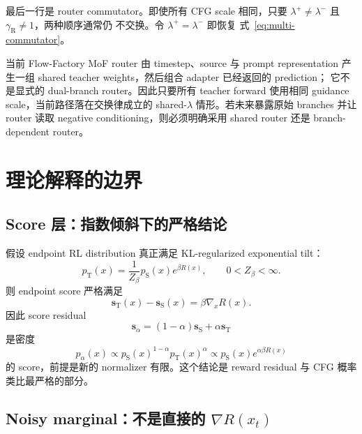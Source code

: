 \documentclass[11pt,a4paper]{article}
\newcommand{\score}{\bm{s}}
\newcommand{\student}{\mathrm{S}}
\newcommand{\teacher}{\mathrm{T}}
\newcommand{\pos}{+}
\newcommand{\negbranch}{-}
\theoremstyle{definition}
\theoremstyle{plain}
\begin{document}
最后一行是 router commutator。即使所有 CFG scale 相同，只要
$\lambda^\pos\neq\lambda^\negbranch$ 且 $\gamma_{\mathrm R}\neq1$，两种顺序通常仍
不交换。令 $\lambda^\pos=\lambda^\negbranch$ 即恢复
式~\eqref{eq:multi-commutator}。

当前 Flow-Factory MoF router 由 timestep、source 与 prompt representation
产生一组 shared teacher weights，然后组合 adapter 已经返回的 prediction；
它不是显式的 dual-branch router。因此只要所有 teacher forward 使用相同
guidance scale，当前路径落在交换律成立的 shared-$\lambda$ 情形。若未来暴露原始
branches 并让 router 读取 negative conditioning，则必须明确采用 shared router
还是 branch-dependent router。

\section{理论解释的边界}

\subsection{Score 层：指数倾斜下的严格结论}

假设 endpoint RL distribution 真正满足 KL-regularized exponential tilt：
\begin{equation}
  p_\teacher(x)
  =
  \frac{1}{Z_\beta}
  p_\student(x)e^{\beta R(x)},
  \qquad
  0<Z_\beta<\infty.
  \label{eq:endpoint-tilt}
\end{equation}
则 endpoint score 严格满足
\begin{equation}
  \score_\teacher(x)-\score_\student(x)
  =
  \beta\nabla_x R(x).
  \label{eq:endpoint-score-residual}
\end{equation}
因此 score residual
\begin{equation}
  \score_\alpha
  =
  (1-\alpha)\score_\student+\alpha\score_\teacher
  \label{eq:score-interpolation}
\end{equation}
是密度
\begin{equation}
  p_\alpha(x)
  \propto
  p_\student(x)^{1-\alpha}p_\teacher(x)^\alpha
  \propto
  p_\student(x)e^{\alpha\beta R(x)}
  \label{eq:score-geometric-density}
\end{equation}
的 score，前提是新的 normalizer 有限。这个结论是 reward residual 与 CFG
概率类比最严格的部分。

\subsection{Noisy marginal：不是直接的 \texorpdfstring{$\nabla R(x_t)$}{grad R}}
\end{document}
